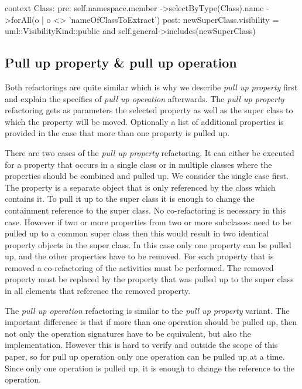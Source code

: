 \documentclass{llncs}
\begin{document}
\begin{lstsingle}[language=OCL,caption=OCL for \textit{extract superclass} refactoring,label=lst:extractsuperclass]
context Class:
pre:  self.namespace.member
        ->selectByType(Class).name
        ->forAll(o | o <> 'nameOfClassToExtract')
post: newSuperClass.visibility = uml::VisibilityKind::public
      and 
      self.general->includes(newSuperClass)
\end{lstsingle}


\subsection{Pull up property \& pull up operation}
\label{sec:pullup}
Both refactorings are quite similar which is why we describe \textit{pull up property} first and explain the specifics of \textit{pull up 
operation} afterwards. The \textit{pull up property} refactoring gets as parameters the selected property as well as the super class to 
which the property will be moved. Optionally a list of additional properties is provided in the case that more than one property is 
pulled up.

There are two cases of the \textit{pull up property} refactoring. It can either be executed for a property that 
occurs in a single class or in multiple classes where the properties should be combined and pulled up. We consider the single case first. 
The property is a separate object that is only referenced by the class which contains it. To pull it up to the super class it is enough to 
change the containment reference to the super class. No co-refactoring is necessary in this case. However if two or more properties from 
two or more subclasses need to be pulled up to a common super class then this would result in two identical property objects in the super 
class. In this case only one property can be pulled up, and the other properties have to be removed. For each property that is removed a 
co-refactoring of the activities must be performed. The removed property must be replaced by the property that was pulled up to the super 
class in all elements that reference the removed property.

The \textit{pull up operation} refactoring is similar to the \textit{pull up property} variant. The important difference is that
if more than one operation should be pulled up, then not only the operation signatures have to be equivalent, but also the implementation.
However this is hard to verify and outside the scope of this paper, so for pull up operation only one operation can be pulled up at a 
time. Since only one operation is pulled up, it is enough to change the reference to the operation.
\end{document}
